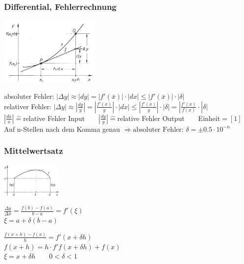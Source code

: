 \subsubsection{Differential, Fehlerrechnung } 
	\begin{minipage}[c]{7cm} 
		\includegraphics[width=5cm]{./bilder/differential_fehlerrechnung.png} 
	\end{minipage}
	\begin{minipage}[c]{13cm} 
		absoluter Fehler: $\left| \Delta y \right|	\approx \left| dy \right|=\left|f'(\bar{x})\right|\cdot\left| dx \right| \leq	\left| f'(\bar{x}) \right| \cdot \left| \delta \right| $  \\
		relativer Fehler: $|\Delta y| \approx |\frac{dy}{y}| = |\frac{f'(x)}{y}| \cdot |dx| \leq |\frac{f'(x)}{y}| \cdot |\delta| = |\frac{f'(x)}{f(x)} \cdot |\delta|  $ \\
		$|\frac{dx}{x}| \hat{=}$relative Fehler Input$ \qquad |\frac{dy}{y}| \hat{=} $relative Fehler Output$ \qquad $Einheit$ = [1]$\\
		Auf n-Stellen nach dem Komma genau $\Rightarrow \mbox{absoluter Fehler: } \delta = \pm 0.5 \cdot 10^{-n}$ 
	\end{minipage}


\subsubsection{Mittelwertsatz }
	\begin{minipage}[c]{5cm} 
		\includegraphics[width=3cm]{./bilder/differential_mittelwertsatz.png} 
	\end{minipage}
	\begin{minipage}[c]{7cm} 
		$\frac{\Delta y}{\Delta x}=\frac{f(b) - f(a)}{b - a} = f'(\xi) $ \\
		$\xi = a + \delta(b-a)$
	\end{minipage}
	\begin{minipage}[c]{5cm}
		$\frac{f(x+h) - f(x)}{h} = f'(x+\delta h)$\\
		$f(x+h) = h \cdot f'f(x+\delta h) + f(x)$ \\
		$\xi = x + \delta h \qquad 0<\delta<1$
	\end{minipage}	

